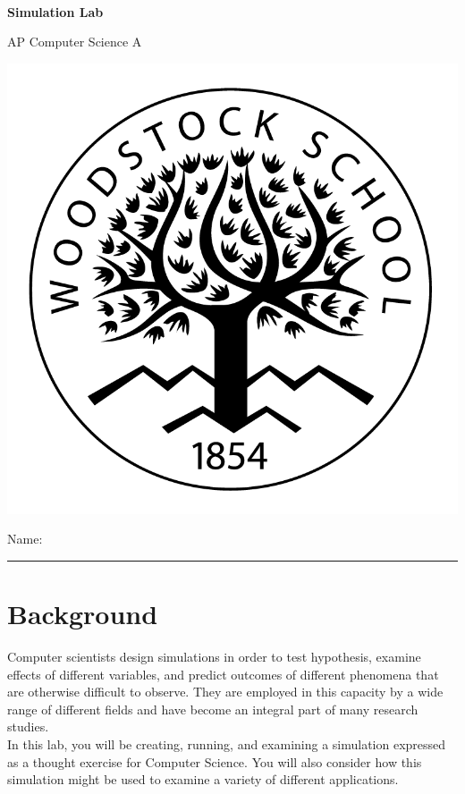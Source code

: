 

\def\LabCourse{AP Computer Science A}
\def\LabNumber{02}
\def\LabTitle{Simulation Lab}


	\begin{coverpages}
		\ \\[2cm]
		\begin{center}
			\huge
			\textbf{\LabTitle}

			\Large
			\LabCourse
		\end{center}

		\vspace{1.5cm}

		\begin{center}
			\includegraphics[scale=0.45]{graphics/logo_black}

			\vspace{2.5cm}

			\Large
			Name: \rule{11.5cm}{0.1pt}
		\end{center}
	\end{coverpages}

	\blankpage

	\thispagestyle{empty}
	\tableofcontents

	\pagebreak

	\section{Background}
		Computer scientists design simulations in order to test hypothesis, examine effects of different variables, and predict outcomes of different phenomena that are otherwise difficult to observe. They are employed in this capacity by a wide range of different fields and have become an integral part of many research studies.\\[\baselineskip]
	  In this lab, you will be creating, running, and examining a simulation expressed as a thought exercise for Computer Science. You will also consider how this simulation might be used to examine a variety of different applications.

